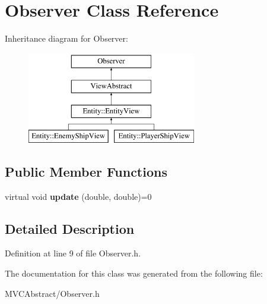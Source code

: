 \hypertarget{classObserver}{}\section{Observer Class Reference}
\label{classObserver}
Inheritance diagram for Observer\+:\begin{figure}[H]
\begin{center}
\leavevmode
\includegraphics[height=4.000000cm]{classObserver}
\end{center}
\end{figure}
\subsection*{Public Member Functions}
\begin{DoxyCompactItemize}
\item 
\mbox{\label{classObserver_a4fa887a95f27b58482488ba16a7e7e04}} 
virtual void {\bfseries update} (double, double)=0
\end{DoxyCompactItemize}


\subsection{Detailed Description}


Definition at line 9 of file Observer.\+h.



The documentation for this class was generated from the following file\+:\begin{DoxyCompactItemize}
\item 
M\+V\+C\+Abstract/Observer.\+h\end{DoxyCompactItemize}
